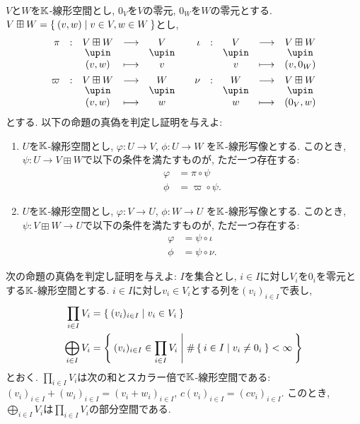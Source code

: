 \begin{quiz}
  $V$と$W$を$\mathbb{K}$-線形空間とし,
  $0_V$を$V$の零元,
  $0_W$を$W$の零元とする.
  $V\boxplus W=\Set{(v,w)|v\in V,w\in W}$とし,
  \begin{align*}
    \shazo{\pi}{V\boxplus W}{V}
    {(v,w)}{v}&&
    \shazo{\iota}{V}{V\boxplus W}
    {v}{(v,0_W)}\\
    \shazo{\varpi}{V\boxplus W}{W}
    {(v,w)}{w}&&
    \shazo{\nu}{W}{V\boxplus W}
    {w}{(0_V,w)}
  \end{align*}
  とする.
  以下の命題の真偽を判定し証明を与えよ:
  \begin{enumerate}
  \item
    $U$を$\mathbb{K}$-線形空間とし,
    $\varphi\colon U\to V$,
    $\phi\colon U\to W$
    を$\mathbb{K}$-線形写像とする.
    このとき,
    $\psi\colon U\to V\boxplus W$で以下の条件を満たすものが,
    ただ一つ存在する:
    \begin{align*}
      \varphi&=\pi\circ\psi\\
      \phi&=\varpi\circ\psi.
    \end{align*}
  \item
    $U$を$\mathbb{K}$-線形空間とし,
    $\varphi\colon V\to U$,
    $\phi\colon W\to U$
    を$\mathbb{K}$-線形写像とする.
    このとき,
    $\psi\colon V\boxplus W\to U$で以下の条件を満たすものが,
    ただ一つ存在する:
    \begin{align*}
      \varphi&=\psi\circ\iota\\
      \phi&=\psi\circ\nu.
    \end{align*}
  \end{enumerate}
\end{quiz}


\begin{quiz}
  次の命題の真偽を判定し証明を与えよ:
  $I$を集合とし, $i\in I$に対し$V_i$を$0_{i}$を零元とする$\mathbb{K}$-線形空間とする.
  $i \in I$に対し$v_i\in V_i$とする列を$(v_i)_{i\in I}$で表し,
  \begin{align*}
    \prod_{i\in I} V_i &=\Set{(v_i)_{i\in I}|v_i\in V_i}\\
    \bigoplus_{i\in I} V_i &=\Set{(v_i)_{i\in I} \in \prod_{i\in I} V_i|\#\Set{i\in I|v_i\neq 0_{i}}<\infty}
  \end{align*}
  とおく.
  $\prod_{i\in I} V_i$は次の和とスカラー倍で$\mathbb{K}$-線形空間である:
  $(v_i)_{i\in I}+(w_i)_{i\in I}=(v_i+w_i)_{i\in I}$,
  $c(v_i)_{i\in I}=(cv_i)_{i\in I}$.
  このとき,
  $\bigoplus_{i\in I} V_i$は$\prod_{i\in I} V_i$の部分空間である.
\end{quiz}


